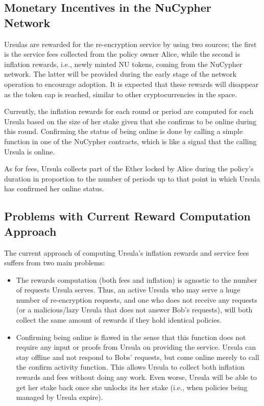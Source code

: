 \subsection{Monetary Incentives in the NuCypher Network}
Ursulas are rewarded for the re-encryption service by using two sources; 
the first is the service fees collected from the policy  
owner Alice, while the second is inflation rewards, i.e., newly minted
NU tokens, coming from the NuCypher network. The latter will be provided during the 
early stage of the network operation to encourage 
adoption. It is expected that these rewards will disappear as the token cap is 
reached, similar to other cryptocurrencies in the space.


Currently, the inflation rewards for each round or period are computed for each Ursula based on the size of her stake given that she confirms to be online during this round. Confirming the status of being online is done by calling a 
simple function in one of the NuCypher contracts, which is like a signal that the calling Ursula is online.

As for fees, Ursula collects part of the Ether locked by Alice during the policy's duration in proportion to the number of periods up to that point in which Ursula has confirmed her online status. 


\subsection{Problems with Current Reward Computation Approach}
The current approach of computing Ursula's inflation rewards and service fees suffers from two
main problems:
\begin{itemize}
\setlength{\itemsep}{0pt}
\item The rewards computation (both fees and inflation) is agnostic to the number of 
requests Ursula serves. Thus, an active Ursula who may serve a huge number of 
re-encryption requests, and one who does not receive any requests (or a
malicious/lazy Ursula that does not answer Bob's requests), will 
both collect the same amount of rewards if they hold identical policies.

\item Confirming being online is flawed in the sense that this function does 
not require any input or proofs from Ursula on providing the service. Ursula 
can stay offline and not respond to Bobs' requests, but come online merely to call the confirm activity
function. This allows Ursula to collect both inflation rewards 
and fees without doing any work. Even worse, Ursula will be able to get her stake back once she unlocks its her stake (i.e., when policies being managed by Ursula expire). 
\end{itemize}



